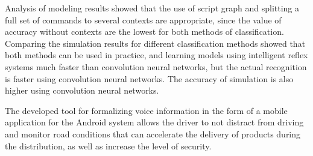 
Analysis of modeling results showed that the use of script graph and splitting a full set of commands to several contexts are appropriate, since the value of accuracy without contexts are the lowest for both methods of classification. Comparing the simulation results for different classification methods showed that both methods can be used in practice, and learning models using intelligent reflex systems much faster than convolution neural networks, but the actual recognition is faster using convolution neural networks. The accuracy of simulation is also higher using convolution neural networks.


The developed tool for formalizing voice information in the form of a mobile application for the Android system allows the driver to not distract from driving and monitor road conditions that can accelerate the delivery of products during the distribution, as well as increase the level of security.


